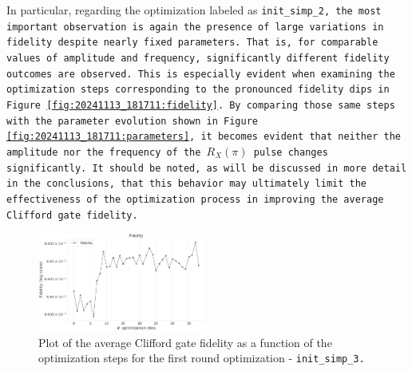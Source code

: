 In particular, regarding the optimization labeled as \tt{init\_simp\_2}, the most important observation is again the presence of large variations in fidelity despite nearly fixed parameters. 
That is, for comparable values of amplitude and frequency, significantly different fidelity outcomes are observed.
This is especially evident when examining the optimization steps corresponding to the pronounced fidelity dips in Figure \ref{fig:20241113_181711:fidelity}.
By comparing those same steps with the parameter evolution shown in Figure \ref{fig:20241113_181711:parameters}, it becomes evident that neither the amplitude nor the frequency of the $R_X(\pi)$ pulse changes significantly. 
It should be noted, as will be discussed in more detail in the conclusions, that this behavior may ultimately limit the effectiveness of the optimization process in improving the average Clifford gate fidelity. 

\begin{figure}[h!]
    \centering
    \includegraphics[width=0.495\textwidth]{figures/png/RB_optimization/NM/InitialSymplex/20241113_200745/fidelity.png}
    \caption{Plot of the average Clifford gate fidelity as a function of the optimization steps for the first round optimization - \tt{init\_simp\_3}.}
    \label{fig:20241113_200745:fidelity}
\end{figure}

